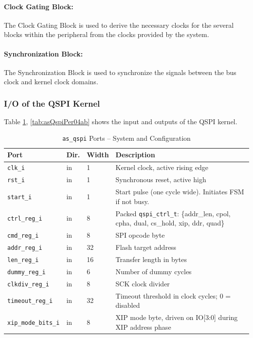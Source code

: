 \paragraph{Clock Gating Block: } The Clock Gating Block is used to derive the necessary clocks for the several blocks within the peripheral from the clocks provided by the system.

\paragraph{Synchronization Block: } The Synchronization Block is used to synchronize the signals between the bus clock and kernel clock domains.

\subsubsection{I/O of the QSPI Kernel}

Table \ref{tab:asQspiPer04a}, \ref{tab:asQspiPer04ab}  shows the input and outputs of the QSPI kernel.

\begin{table}[H]
\caption{\texttt{as\_qspi} Ports -- System and Configuration}
\label{tab:asQspiPer04a}
\centering
\begin{tabularx}{\textwidth}{|l|l|l|X|}
  \hline
  Port & Dir. & Width & Description \\
  \hline\hline
  \texttt{clk\_i}           & in  & 1  & Kernel clock, active rising edge \\
  \hline
  \texttt{rst\_i}           & in  & 1  & Synchronous reset, active high \\
  \hline
  \texttt{start\_i}         & in  & 1  & Start pulse (one cycle wide). Initiates FSM if not busy. \\
  \hline
  \texttt{ctrl\_reg\_i}     & in  & 8  & Packed \texttt{qspi\_ctrl\_t}: \{addr\_len, cpol, cpha, dual, cs\_hold, xip, ddr, quad\} \\
  \hline
  \texttt{cmd\_reg\_i}      & in  & 8  & SPI opcode byte \\
  \hline
  \texttt{addr\_reg\_i}     & in  & 32 & Flash target address \\
  \hline
  \texttt{len\_reg\_i}      & in  & 16 & Transfer length in bytes \\
  \hline
  \texttt{dummy\_reg\_i}    & in  & 6  & Number of dummy cycles \\
  \hline
  \texttt{clkdiv\_reg\_i}   & in  & 8  & SCK clock divider \\
  \hline
  \texttt{timeout\_reg\_i}  & in  & 32 & Timeout threshold in clock cycles; 0 = disabled \\
  \hline
  \texttt{xip\_mode\_bits\_i}& in & 8  & XIP mode byte, driven on IO[3:0] during XIP address phase \\
  \hline
\end{tabularx}
\end{table}

